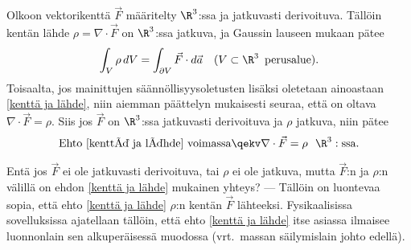 Olkoon vektorikenttä $\vec F$ määritelty $\R^3$:ssa ja jatkuvasti derivoituva. 
Tällöin kentän lähde $\rho=\nabla\cdot\vec F$ on $\R^3$:ssa jatkuva, ja Gaussin lauseen mukaan
pätee
\begin{equation} \label{kenttä ja lähde}
\int_V \rho\,dV = \int_{\partial V}\vec F\cdot d\vec a \quad (V\subset\R^3\,\ \text{perusalue}).
\end{equation}
Toisaalta, jos mainittujen säännöllisyysoletusten lisäksi oletetaan ainoastaan
\eqref{kenttä ja lähde}, niin aiemman päättelyn mukaisesti seuraa, että on oltava
$\nabla\cdot\vec F=\rho$. Siis jos $\vec F$ on $\R^3$:ssa jatkuvasti derivoituva ja $\rho$
jatkuva, niin pätee
\[
\text{Ehto \eqref{kenttä ja lähde} voimassa} \qekv \nabla\cdot\vec F = \rho\ \ \R^3:\text{ssa}.
\]

Entä jos $\vec F$ ei ole jatkuvasti derivoituva, tai $\rho$ ei ole jatkuva, mutta $\vec F$:n ja
$\rho$:n välillä on ehdon \eqref{kenttä ja lähde} mukainen yhteys? --- Tällöin on luontevaa
sopia, että ehto \eqref{kenttä ja lähde}  $\rho$:n kentän $\vec F$ lähteeksi.
Fysikaalisissa sovelluksissa ajatellaan tällöin, että ehto \eqref{kenttä ja lähde} itse asiassa
ilmaisee luonnonlain sen alkuperäisessä muodossa (vrt.\ massan säilymislain johto edellä).

